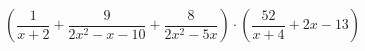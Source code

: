 \begin{ex}[type=expression]
	\begin{condition}
		\(\left( \dfrac{1}{x+2}+\dfrac{9}{2x^2-x-10}+\dfrac{8}{2x^2-5x} \right)\cdot\left( \dfrac{52}{x+4}+2x-13 \right)\)
	\end{condition}
\end{ex}